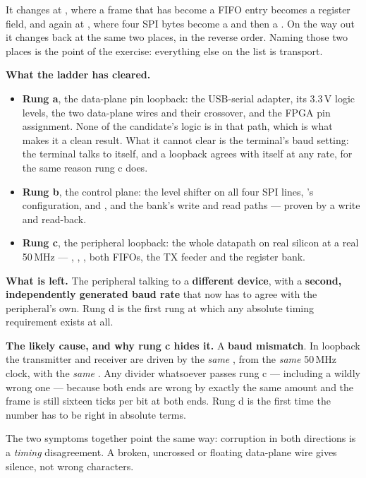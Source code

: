 It changes at \textbf{}, where a frame that has become a FIFO entry becomes a
register field, and again at \textbf{}, where four SPI bytes become a
 and then a . On the way out it changes back at the same two places, in
the reverse order. Naming those two places is the point of the exercise: everything else on the
list is transport.

\textbf{What the ladder has cleared.}
\begin{itemize}
  \item \textbf{Rung a}, the data-plane pin loopback: the USB-serial adapter, its 3.3\,V logic
    levels, the two data-plane wires and their crossover, and the FPGA pin assignment. None of the
    candidate's logic is in that path, which is what makes it a clean result. What it cannot clear is
    the terminal's baud setting: the terminal talks to itself, and a loopback agrees with itself at
    any rate, for the same reason rung c does.
  \item \textbf{Rung b}, the control plane: the level shifter on all four SPI lines,
    's configuration,  and , and the bank's write
    and read paths --- proven by a  write and read-back.
  \item \textbf{Rung c}, the peripheral loopback: the whole datapath on real silicon at a real
    50\,MHz --- , , , both FIFOs, the TX feeder and the
    register bank.
\end{itemize}

\textbf{What is left.} The peripheral talking to a \textbf{different device}, with a \textbf{second,
independently generated baud rate} that now has to agree with the peripheral's own. Rung d is the
first rung at which any absolute timing requirement exists at all.

\textbf{The likely cause, and why rung c hides it.} A \textbf{baud mismatch}. In loopback the
transmitter and receiver are driven by the \emph{same} , from the \emph{same}
50\,MHz clock, with the \emph{same} . Any divider whatsoever passes rung c ---
including a wildly wrong one --- because both ends are wrong by exactly the same amount and the frame
is still sixteen ticks per bit at both ends. Rung d is the first time the number has to be right in
absolute terms.

The two symptoms together point the same way: corruption in both directions is a \emph{timing}
disagreement. A broken, uncrossed or floating data-plane wire gives silence, not wrong characters.

